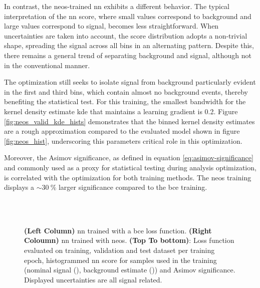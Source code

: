 In contrast, the \ac{neos}-trained \ac{nn} exhibits a different behavior. The typical interpretation of the \ac{nn} score, where small values correspond to background and large values correspond to signal, becomes less straightforward. When uncertainties are taken into account, the score distribution adopts a non-trivial shape, spreading the signal across all bins in an alternating pattern. Despite this, there remains a general trend of separating background and signal, although not in the conventional manner.

The optimization still seeks to isolate signal from background particularly evident in the first and third bins, which contain almost no background events, thereby benefiting the statistical test. For this training, the smallest bandwidth for the kernel density estimate \ac{kde} that maintains a learning gradient is 0.2. Figure \ref{fig:neos_valid_kde_hists} demonstrates that the binned kernel density estimates are a rough approximation compared to the evaluated model shown in figure \ref{fig:neos_hist}, underscoring this parameters critical role in this optimization.

Moreover, the Asimov significance, as defined in equation \ref{eq:asimov-significance} and commonly used as a proxy for statistical testing during analysis optimization, is correlated with the optimization for both training methods. The \ac{neos} training displays a $\sim\qty[]{30}{\percent}$ larger significance compared to the \ac{bce} training.

\begin{figure}
    \centering
     \label{fig:neos_validation_loss}\\
     \label{fig:neos_hist}\\
    \caption[]{\textbf{(Left Column)} \ac{nn} trained with a \ac{bce} loss function. \textbf{(Right Coloumn)} \ac{nn} trained with \ac{neos}.  \textbf{(Top To bottom)}: Loss function evaluated on training, validation and test dataset per training epoch, histogrammed \ac{nn} score for samples used in the training (nominal signal (), background estimate ()) and Asimov significance. Displayed uncertainties are all signal related.}
    \label{fig:training_metrics_validation}
\end{figure}


